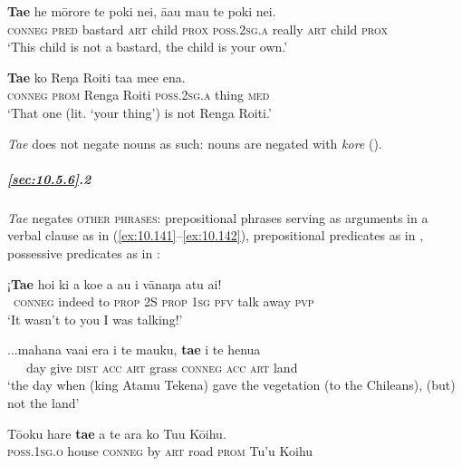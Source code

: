 \ea\label{ex:10.139}
\gll \textbf{Ta{\ꞌ}e} he mōrore te poki nei, {\ꞌ}ā{\ꞌ}au mau te poki nei. \\
\textsc{conneg} \textsc{pred} bastard \textsc{art} child \textsc{prox} \textsc{poss.2sg.a} really \textsc{art} child \textsc{prox} \\

\glt 
‘This child is not a bastard, the child is your own.’ \textstyleExampleref{[Ley-2-07.027]}
\z

\ea\label{ex:10.140}
\gll \textbf{Ta{\ꞌ}e} ko Reŋa Roiti ta{\ꞌ}a me{\ꞌ}e ena. \\
\textsc{conneg} \textsc{prom} Renga Roiti \textsc{poss.2sg.a} thing \textsc{med} \\

\glt
‘That one (lit. ‘your thing’) is not Renga Roiti.’ \textstyleExampleref{[Ley-9-56.092]}
\z

\textit{Ta{\ꞌ}e} does not negate nouns as such: nouns are negated with \textit{kore} (). 

\subparagraph{\ref{sec:10.5.6}.2} \textit{Ta{\ꞌ}e} negates \textsc{other phrases}: prepositional phrases serving as arguments in a verbal clause as in (\ref{ex:10.141}–\ref{ex:10.142}), prepositional predicates as in , possessive predicates as in :

\ea\label{ex:10.141}
\gll ¡\textbf{Ta{\ꞌ}e} ho{\ꞌ}i ki a koe a au i vānaŋa atu ai! \\
~\textsc{conneg} indeed to \textsc{prop} 2S \textsc{prop} \textsc{1sg} \textsc{pfv} talk away \textsc{pvp} \\

\glt 
‘It wasn’t to you I was talking!’ \textstyleExampleref{[R315.135]} 
\z

\ea\label{ex:10.142}
\gll ...mahana va{\ꞌ}ai era i te mauku, \textbf{ta{\ꞌ}e} i te henua \\
~~~day give \textsc{dist} \textsc{acc} \textsc{art} grass \textsc{conneg} \textsc{acc} \textsc{art} land \\

\glt 
‘the day when (king Atamu Tekena) gave the vegetation (to the Chileans), (but) not the land’ \textstyleExampleref{[R649.172]} 
\z

\ea\label{ex:10.143}
\gll Tō{\ꞌ}oku hare \textbf{ta{\ꞌ}e} a te ara ko Tu{\ꞌ}u Kōihu. \\
\textsc{poss.1sg.o} house \textsc{conneg} by \textsc{art} road \textsc{prom} Tu’u Koihu \\

